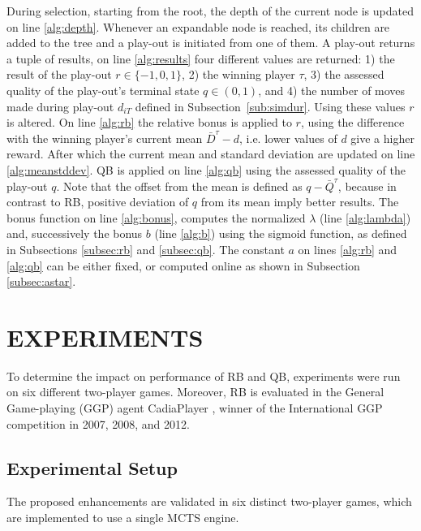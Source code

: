 \documentclass{ecai2014}
\begin{document}
During selection, starting from the root, the depth of the current node is updated on line \ref{alg:depth}. Whenever an expandable node is reached, its children are added to the tree and a play-out is initiated from one of them. A play-out returns a tuple of results, on line \ref{alg:results} four different values are returned: 1) the result of the play-out $r \in \{-1, 0, 1\}$, 2) the winning player $\tau$, 3) the assessed quality of the play-out's terminal state $q\in(0,1)$, and 4) the number of moves made during play-out $d_{iT}$ defined in Subsection~\ref{sub:simdur}. Using these values $r$ is altered. On line \ref{alg:rb} the relative bonus is applied to $r$, using the difference with the winning player's current mean $\bar{D}^\tau - d$, i.e. lower values of $d$ give a higher reward. After which the current mean and standard deviation are updated on line \ref{alg:meanstddev}. QB is applied on line \ref{alg:qb} using the assessed quality of the play-out $q$. Note that the offset from the mean is defined as $q - \bar{Q}^\tau$, because in contrast to RB, positive deviation of $q$ from its mean imply better results. The {\sc bonus} function on line \ref{alg:bonus}, computes the normalized $\lambda$ (line \ref{alg:lambda}) and, successively the bonus $b$ (line \ref{alg:b}) using the sigmoid function, as defined in Subsections \ref{subsec:rb} and \ref{subsec:qb}. The constant $a$ on lines \ref{alg:rb} and \ref{alg:qb} can be either fixed, or computed online as shown in Subsection \ref{subsec:astar}.

\section{EXPERIMENTS}
\label{sec:experiments}
To determine the impact on performance of RB and QB, experiments were run on six different two-player games. Moreover, RB is evaluated in the General Game-playing (GGP) agent {\sc CadiaPlayer} \cite{bjornsson2009cadiaplayer}, winner of the International GGP competition in 2007, 2008, and 2012.

\subsection{Experimental Setup}
\label{subsec:expsetup}
The proposed enhancements are validated in six distinct two-player games, which are implemented to use a single MCTS engine.
\end{document}
